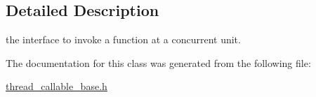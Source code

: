 \subsection{Detailed Description}
the interface to invoke a function at a concurrent unit. 

The documentation for this class was generated from the following file\-:\begin{DoxyCompactItemize}
\item 
\hyperlink{thread__callable__base_8h}{thread\-\_\-callable\-\_\-base.\-h}\end{DoxyCompactItemize}
